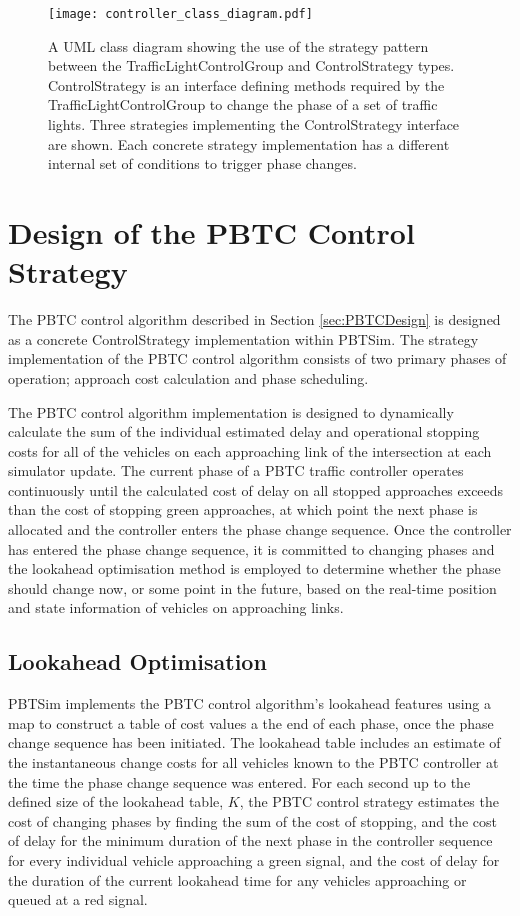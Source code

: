 \begin{figure}[]
\centering
	\texttt{[image: controller\_class\_diagram.pdf]}
	\caption[A UML class diagram of the PBTSim application architecture.]{ A UML class diagram showing the use of the strategy pattern between the TrafficLightControlGroup and ControlStrategy types. ControlStrategy is an interface defining methods required by the TrafficLightControlGroup to change the phase of a set of traffic lights. Three strategies implementing the ControlStrategy interface are shown. Each concrete strategy implementation has a different internal set of conditions to trigger phase changes. }
\label{controllerclassdiagram}
\end{figure}


\section{Design of the PBTC Control Strategy}

The PBTC control algorithm described in Section \ref{sec:PBTCDesign} is designed as a concrete ControlStrategy implementation within PBTSim. The strategy implementation of the PBTC control algorithm consists of two primary phases of operation; approach cost calculation and phase scheduling. 

The PBTC control algorithm implementation is designed to dynamically calculate the sum of the individual estimated delay and operational stopping costs for all of the vehicles on each approaching link of the intersection at each simulator update. The current phase of a PBTC traffic controller operates continuously until the calculated cost of delay on all stopped approaches exceeds than the cost of stopping green approaches, at which point the next phase is allocated and the controller enters the phase change sequence. Once the controller has entered the phase change sequence, it is  committed to changing phases and the lookahead optimisation method is employed to determine whether the phase should change now, or some point in the future, based on the real-time position and state information of vehicles on approaching links. 

\subsection{Lookahead Optimisation}

PBTSim implements the PBTC control algorithm's lookahead features using a map to construct a table of cost values a the end of each phase, once the phase change sequence has been initiated. The lookahead table includes an estimate of the instantaneous change costs for all vehicles known to the PBTC controller at the time the phase change sequence was entered. For each second up to the defined size of the lookahead table, $K$, the PBTC control strategy estimates the cost of changing phases by finding the sum of the cost of stopping, and the cost of delay for the minimum duration of the next phase in the controller sequence for every individual vehicle approaching a green signal, and the cost of delay for the duration of the current lookahead time for any vehicles approaching or queued at a red signal. 

